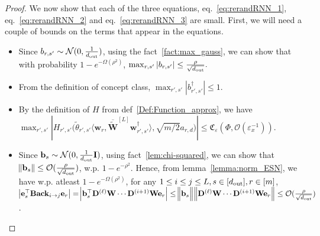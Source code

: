 \begin{proof}
			We now show that each of the three equations, eq.~\ref{eq:rerandRNN_1}, eq.~\ref{eq:rerandRNN_2} and eq.~\ref{eq:rerandRNN_3} are small. First, we will need a couple of bounds on the terms that appear in the equations.
			\begin{itemize}
				\item Since $b_{r, s'} \sim \mathcal{N}(0, \frac{1}{d_{\mathrm{out}} })$, using the fact~\ref{fact:max_gauss}, we can show that with probability $1-e^{-\Omega(\rho^2)}$,
				$\max_{r, s'} | b_{r, s'} | \le \frac{\rho}{\sqrt{d_{\mathrm{out}} }}.$ 
				\item From the definition of concept class,  $\max_{r',s'} | b_{r', s'}^{\dagger} | \le 1$. 
				\item By the definition of $H$ from def~\ref{Def:Function_approx}, we have $\max_{r',s'} |  H_{r', s'}\Big(\widetilde{\theta}_{r', s'} \langle \mathbf{w}_{r}, \overline{\widetilde{\mathbf{W}}}^{[L]} \mathbf{w}_{r', s'}^{\dagger}\rangle , \sqrt{m/2} a_{r, d}\Big) | \le \mathfrak{C}_{\varepsilon}(\Phi, \mathcal{O}(\varepsilon_x^{-1}))$.
				\item Since $\mathbf{b}_s \sim \mathcal{N}(0, \frac{1}{d_{\mathrm{out}} } \mathbf{I})$, using fact~\ref{lem:chi-squared}, we can show that $\norm{\mathbf{b}_s} \le \mathcal{O}(\frac{\rho}{\sqrt{d_{\mathrm{out}} }})$, w.p. $1-e^{-\rho^2}$. Hence, from lemma~\ref{lemma:norm_ESN}, we have w.p. atleast $1 - e^{-\Omega(\rho^2)}$, for any $1 \le i \le j \le L, s \in [d_{\mathrm{out}} ], r \in [m]$, $\abs{\mathbf{e}_s^{\top} \mathbf{Back}_{i \to j} \mathbf{e}_r} = 
				\abs{\mathbf{b}_s^{\top} \mathbf{D}^{(\ell)} \mathbf{W} \cdots \mathbf{D}^{(i+1)} \mathbf{W}\mathbf{e}_r} \le \norm[2]{\mathbf{b}_s} \norm[2]{\mathbf{D}^{(\ell)} \mathbf{W} \cdots \mathbf{D}^{(i+1)} \mathbf{W}\mathbf{e}_r} \le \mathcal{O}(\frac{\rho}{\sqrt{d_{\mathrm{out}} }})$.
			\end{itemize}
			

\end{proof}
